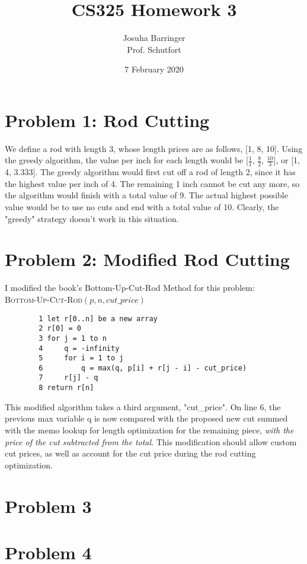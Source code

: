 \documentclass{article}
\title{CS325 Homework 3}
\author{Josuha Barringer \\ Prof. Schutfort}
\date{7 February 2020}
\begin{document}
\maketitle

\section*{Problem 1: Rod Cutting}

We define a rod with length 3, whose length prices are as follows, [1, 8, 10].  Using the greedy algorithm, the value per inch for each length would be [$\frac{1}{1}$, $\frac{8}{2}$, $\frac{10}{3}$], or [1, 4, 3.$\overline{333}$].  The greedy algorithm would first cut off a rod of length 2, since it has the highest value per inch of 4.  The remaining 1 inch cannot be cut any more, so the algorithm would finish with a total value of 9.  The actual highest possible value would be to use no cuts and end with a total value of 10.  Clearly, the "greedy" strategy doesn't work in this situation.

\section*{Problem 2: Modified Rod Cutting}

I modified the book's Bottom-Up-Cut-Rod Method for this problem:\\

\textsc{Bottom-Up-Cut-Rod$(p,n,cut\_price)$}

    \begin{verbatim}
        1 let r[0..n] be a new array
        2 r[0] = 0
        3 for j = 1 to n
        4     q = -infinity
        5     for i = 1 to j
        6         q = max(q, p[i] + r[j - i] - cut_price)
        7     r[j] - q
        8 return r[n]
    \end{verbatim}
    
This modified algorithm takes a third argument, "cut\_price".  On line 6, the previous max variable q is now compared with the proposed new cut summed with the memo lookup for length optimization for the remaining piece, \textit{with the price of the cut subtracted from the total}.  This modification should allow custom cut prices, as well as account for the cut price during the rod cutting optimization.

\section*{Problem 3}

\section*{Problem 4}
\end{document}
